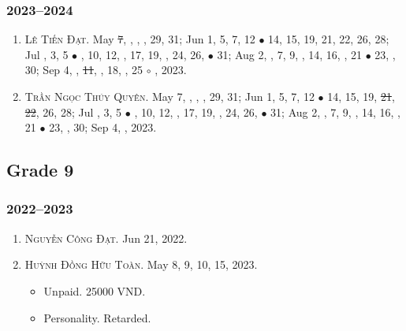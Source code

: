 \documentclass{article}
\begin{document}
\subsubsection{2023--2024}

\begin{enumerate}
	\item \textsc{Lê Tiến Đạt.} May \st{7}, , , , 29, 31; Jun 1, 5, 7, 12 $\bullet$ 14, 15, 19, 21, 22, 26, 28; Jul , 3, 5 $\bullet$ , 10, 12, , 17, 19, , 24, 26,  $\bullet$ 31; Aug 2, , 7, 9, , 14, 16, , 21 $\bullet$ 23, , 30; Sep 4, , \st{11}, , 18, , 25 $\circ$ , 2023.
	\item \textsc{Trần Ngọc Thúy Quyên.} May 7, , , , 29, 31; Jun 1, 5, 7, 12 $\bullet$ 14, 15, 19, \st{21}, \st{22}, 26, 28; Jul , 3, 5 $\bullet$ , 10, 12, , 17, 19, , 24, 26,  $\bullet$ 31; Aug 2, , 7, 9, , 14, 16, , 21 $\bullet$ 23, , 30; Sep 4, , 2023.
\end{enumerate}


\subsection{Grade 9}

\subsubsection{2022--2023}

\begin{enumerate}
	\item \textsc{Nguyễn Công Đạt.} {\sf[In]} Jun 21, 2022. {\sf[Out]}
	\item \textsc{Huỳnh Đồng Hữu Toàn.} {\sf[In]} May 8, 9, 10, 15, 2023. {\sf[Out]}
	\begin{itemize}
		\item {\sf Unpaid.} 25000 VND.
		\item {\sf Personality.} Retarded.
	\end{itemize}
\end{enumerate}
\end{document}
